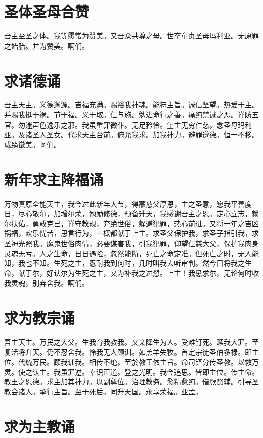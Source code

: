\documentclass[UTF8,17pt]{ctexart}
\begin{document}
\section{圣体圣母合赞}

吾主⾄圣之体。我等愿常为赞美。又吾众共尊之母。世卒童贞圣母玛利亚。⽆原罪之始胎。并为赞美。啊们。

\section{求诸德诵}

吾主天主。义德渊源。吉福充满。赐裕我神魂。能符主旨。诚信坚望。热爱于主。并赐我挺于祸。节于福。义于取。仁与施。勉进命⾏之善。痛纯禁诫之恶。谨防五官。勿迷声⾊逸乐之邪。我虽重罪微仆。⽆⾜矜怜。望主⽆穷仁慈。念圣母玛利亚。及诸圣⼈圣⼥。代求天主台前。俯允我求。加我神⼒。避罪遵德。恒⼀不移。咸臻徽美。啊们。

\section{新年求主降福诵}

万物真原全能天主，我今过此新年⼤节，得蒙慈⽗厚恩，主之圣意，愿我平善度⽇，尽⼼敬尔，加增尔荣，勉励修德，预备升天，我感谢吾主之恩。定⼼⽴志，赖尔扶佑，勇敢克已，谨守教规，弃绝世俗，躲避犯罪，热⼼前进。又将⼀年之吉凶祸福，欢乐忧苦，思⾔⾏为，⼀概都献于上主。求圣⽗保护我，求圣⼦指引我，求圣神光照我。魔⿁世俗⾁情，必要谋害我，引我犯罪，仰望仁慈⼤⽗，保护我⾁⾝灵魂⽆亏。⼈之⽣命，⽇⽇遇险，忽然能断，死亡之命定准。但死亡之时，⽆⼈能知，我也不知。⽣死之主，忍耐我到何时，⼏时叫我去听审判。然今⽇将我之⽣命，献于尔，好认尔为⽣死之主，又为补我之过愆。上主！我恳求尔，⽆论何时收我灵魂，别弃舍我。啊们。

\section{求为教宗诵}

吾主天主。万民之⼤⽗。⽣我育我教我。又亲降⽣为⼈。受难钉死。赎我⼤罪。⾄复活将升天。仍不忍舍我。怜我⽆⼈顾训。如羔⽺失牧。⾸定宗徒圣伯多禄。即主位。代统万民。顾我训我。相传不绝。⾄於教王依主旨。命司铎分传圣教。以救万灵。使之认主。我虽罪逆。幸识正道。登之光明。我今追思。皆即主位。传主命。教王之恩德。求主加其神⼒。以副尊位。治理教务。愈精愈纯。偕厥贤辅。引导圣教会诸⼈。承⾏主旨。⾄于死后。同升天国。永享荣福。亚孟。

\section{求为主教诵}
\end{document}
